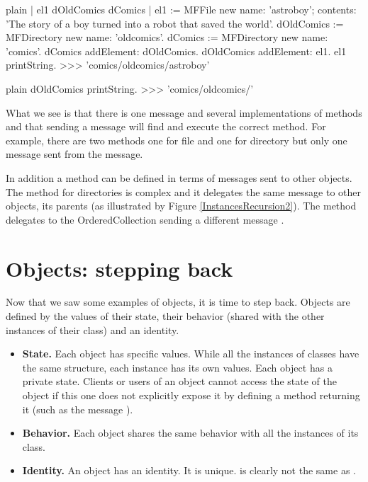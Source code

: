 \documentclass[10pt,twoside,english]{_support/latex/sbabook/sbabook}
\begin{document}
\begin{displaycode}{plain}
| el1 dOldComics dComics |
el1 := MFFile new name: 'astroboy'; contents: 'The story of a boy turned into a robot that saved the world'.
dOldComics := MFDirectory new name: 'oldcomics'.
dComics := MFDirectory new name: 'comics'.
dComics addElement: dOldComics.
dOldComics addElement: el1. 
el1 printString.
>>>
'comics/oldcomics/astroboy'
\end{displaycode}

\begin{displaycode}{plain}
dOldComics printString.
>>>
'comics/oldcomics/'
\end{displaycode}

What we see is that there is one message and several implementations of methods and that sending a message will find and execute the correct method. For example, there are two methods  one for file and one for directory but only one message  sent from the  message.

In addition a method can be defined in terms of messages sent to other objects. The method  for directories is complex and it delegates the same message to other objects, its parents (as illustrated by Figure \ref{InstancesRecursion2}). The method  delegates to the OrderedCollection sending a different message .
\section{Objects: stepping back}
Now that we saw some examples of objects, it is time to step back. Objects are defined by the values of their state, their behavior (shared with the other instances of their class) and an identity. 

\begin{itemize}
\item \textbf{State.} Each object has specific values. While all the instances of classes have the same structure, each instance has its own values. Each object has a private state. Clients or users of an object cannot access the state of the object if this one does not explicitly expose it by defining a method returning it (such as the message ).
\item \textbf{Behavior.} Each object shares the same behavior with all the instances of its class.
\item \textbf{Identity.} An object has an identity. It is unique.  is clearly not the same as .
\end{itemize}
\end{document}

